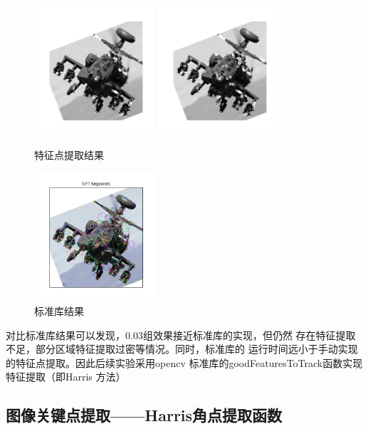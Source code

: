 \documentclass{article}
\begin{document}
\begin{figure}[h]
\centering
\includegraphics[width=0.4\textwidth]{./result/004}
\includegraphics[width=0.4\textwidth]{./result/003}
\caption{特征点提取结果}
\end{figure}

\begin{figure}[h]
\centering
\includegraphics[width=0.4\textwidth]{./result/standard}
\caption{标准库结果}
\end{figure}

    对比标准库结果可以发现，0.03组效果接近标准库的实现，但仍然
    存在特征提取不足，部分区域特征提取过密等情况。同时，标准库的
    运行时间远小于手动实现的特征点提取。因此后续实验采用opencv
    标准库的goodFeaturesToTrack函数实现特征提取（即Harris
    方法）
    
\subsection{图像关键点提取——Harris角点提取函数}
\end{document}
